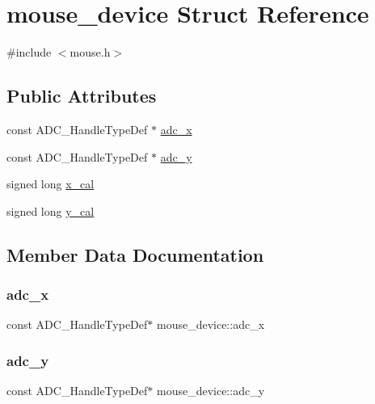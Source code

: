 \hypertarget{structmouse__device}{}\section{mouse\+\_\+device Struct Reference}
\label{structmouse__device}


{\ttfamily \#include $<$mouse.\+h$>$}

\subsection*{Public Attributes}
\begin{DoxyCompactItemize}
\item 
const A\+D\+C\+\_\+\+Handle\+Type\+Def $\ast$ \hyperlink{structmouse__device_a665ae416b6a6493b1163465882abc0bd}{adc\+\_\+x}
\item 
const A\+D\+C\+\_\+\+Handle\+Type\+Def $\ast$ \hyperlink{structmouse__device_a117862e55e75759eee8228c3a4ed87d4}{adc\+\_\+y}
\item 
signed long \hyperlink{structmouse__device_a26d6bdcbf761da9f1a25b1306b9d5537}{x\+\_\+cal}
\item 
signed long \hyperlink{structmouse__device_a4cca0d6c7a390712d323549f2f33b4f5}{y\+\_\+cal}
\end{DoxyCompactItemize}


\subsection{Member Data Documentation}
\mbox{\label{structmouse__device_a665ae416b6a6493b1163465882abc0bd}} 
\subsubsection{\texorpdfstring{adc\+\_\+x}{adc\_x}}
{\footnotesize\ttfamily const A\+D\+C\+\_\+\+Handle\+Type\+Def$\ast$ mouse\+\_\+device\+::adc\+\_\+x}

\mbox{\label{structmouse__device_a117862e55e75759eee8228c3a4ed87d4}} 
\subsubsection{\texorpdfstring{adc\+\_\+y}{adc\_y}}
{\footnotesize\ttfamily const A\+D\+C\+\_\+\+Handle\+Type\+Def$\ast$ mouse\+\_\+device\+::adc\+\_\+y}

